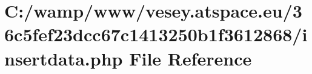 \hypertarget{36c5fef23dcc67c1413250b1f3612868_2insertdata_8php}{\section{C\-:/wamp/www/vesey.atspace.\-eu/36c5fef23dcc67c1413250b1f3612868/insertdata.php File Reference}
\label{36c5fef23dcc67c1413250b1f3612868_2insertdata_8php}
}
